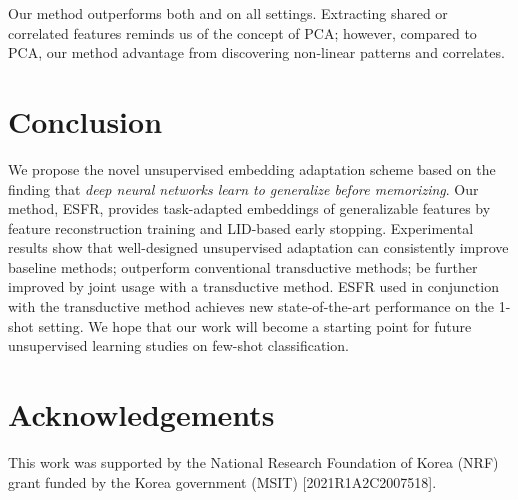 \documentclass{article}
\begin{document}
Our method outperforms both \citet{epnet} and \citet{TAFSSL} on all settings. Extracting shared or correlated features reminds us of the concept of PCA; however, compared to PCA, our method advantage from discovering non-linear patterns and correlates.  \section{Conclusion}
We propose the novel unsupervised embedding adaptation scheme based on the finding that \textit{deep neural networks learn to generalize before memorizing}.
Our method, ESFR, provides task-adapted embeddings of generalizable features by feature reconstruction training and LID-based early stopping.
Experimental results show that well-designed unsupervised adaptation can consistently improve baseline methods; outperform conventional transductive methods; be further improved by joint usage with a transductive method.
ESFR used in conjunction with the transductive method achieves new state-of-the-art performance on the 1-shot setting.
We hope that our work will become a starting point for future unsupervised learning studies on few-shot classification. 
\section*{Acknowledgements}
This work was supported by the National Research Foundation of Korea (NRF) grant funded by the Korea government (MSIT) [2021R1A2C2007518].





\renewcommand\thesection{\Alph{section}}
\onecolumn
\setcounter{section}{0}
\end{document}
